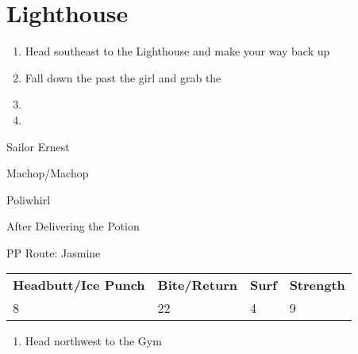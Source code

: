 \chapter{Lighthouse}
\vspace{0.5mm}

\begin{paracol}{2}
\begin{enumerate}
	\item Head southeast to the Lighthouse and make your way back up 
	\item Fall down the  past the girl and grab the 
	\item {}
	\item {}
\end{enumerate}

\switchcolumn
\begin{trainer}{Sailor Ernest}
	\varwb
	\begin{fightSection}{Machop/Machop}
		\item {} \headbutt{} 
	\end{fightSection}
	\begin{fightSection}{Poliwhirl}
		\item {} \bite
	\end{fightSection}
	\varwe
\end{trainer}

\switchcolumn
\begin{menu}{After Delivering the Potion}
	\varwb
	\begin{packMenu}
		\item \escapeRope
	\end{packMenu}
	\varwe
\end{menu}

\switchcolumn*
\begin{misc}{PP Route: Jasmine}
	\varwb
	\begin{tabu} to \textwidth {X[6,c] X[5,c] X[4,c] X[4,c]}
		\textbf{Headbutt/Ice Punch} & \textbf{Bite/Return} & \textbf{Surf} & \textbf{Strength}\\ 
		8 & 22 & 4 & 9
	\end{tabu}
	\varwe
\end{misc}

\switchcolumn
\begin{enumerate}[resume]
	\item Head northwest to the Gym
\end{enumerate}


\end{paracol}
